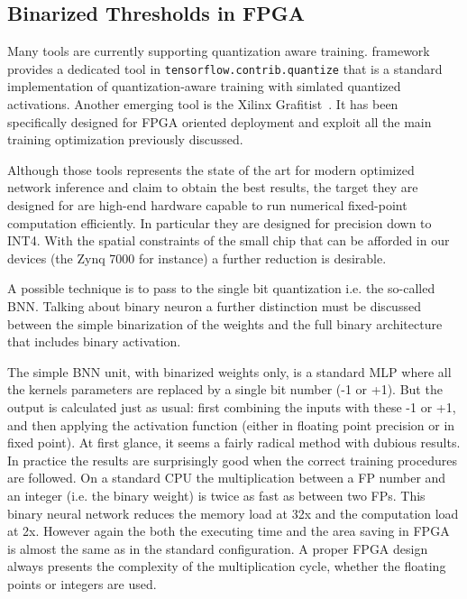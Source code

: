 \subsection*{Binarized Thresholds in FPGA}
\label{section:BNN thresholds}

Many tools are currently supporting quantization aware training. \Tensorflow framework provides a dedicated tool in \texttt{tensorflow.contrib.quantize} that is a standard implementation of quantization-aware training with simlated quantized activations. Another emerging tool is the Xilinx Grafitist~\cite{tqt2019}. It has been specifically designed for FPGA oriented deployment and exploit all the main training optimization previously discussed.

Although those tools represents the state of the art for modern optimized network inference and claim to obtain the best results, the target they are designed for are high-end hardware capable to run numerical fixed-point computation efficiently. 
In particular they are designed for precision down to INT4.
With the spatial constraints of the small chip that can be afforded in our devices (the Zynq 7000 for instance) a further reduction is desirable.

A possible technique is to pass to the single bit quantization i.e. the so-called \ac{BNN}.
Talking about binary neuron a further distinction must be discussed between the simple binarization of the weights and the full binary architecture that includes binary activation.

The simple BNN unit, with binarized weights only, is a standard MLP where all the kernels parameters are replaced by a single bit number (-1 or +1). But the output is calculated just as usual: first combining the inputs with these -1 or +1, and then applying the activation function (either in floating point precision or in fixed point). At first glance, it seems a fairly radical method with dubious results. In practice the results are surprisingly good when the correct training procedures are followed.
On a standard CPU the multiplication between a FP number and an integer (i.e. the binary weight) is twice as fast as between two FPs. This binary neural network reduces the memory load at 32x and the computation load at 2x. 
However again the both the executing time and the area saving in FPGA is almost the same as in the standard configuration. A proper FPGA design always presents the complexity of the multiplication cycle, whether the floating points or integers are used. 

